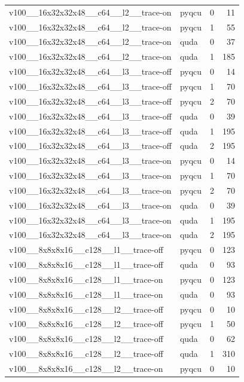 \begin{table}[htbp]
\begin{tabular}{@{}llrr@{}}
v100\_\_16x32x32x48\_\_c64\_\_l2\_\_trace-on & pyqcu & 0 & 11 \\
v100\_\_16x32x32x48\_\_c64\_\_l2\_\_trace-on & pyqcu & 1 & 55 \\
v100\_\_16x32x32x48\_\_c64\_\_l2\_\_trace-on & quda & 0 & 37 \\
v100\_\_16x32x32x48\_\_c64\_\_l2\_\_trace-on & quda & 1 & 185 \\
v100\_\_16x32x32x48\_\_c64\_\_l3\_\_trace-off & pyqcu & 0 & 14 \\
v100\_\_16x32x32x48\_\_c64\_\_l3\_\_trace-off & pyqcu & 1 & 70 \\
v100\_\_16x32x32x48\_\_c64\_\_l3\_\_trace-off & pyqcu & 2 & 70 \\
v100\_\_16x32x32x48\_\_c64\_\_l3\_\_trace-off & quda & 0 & 39 \\
v100\_\_16x32x32x48\_\_c64\_\_l3\_\_trace-off & quda & 1 & 195 \\
v100\_\_16x32x32x48\_\_c64\_\_l3\_\_trace-off & quda & 2 & 195 \\
v100\_\_16x32x32x48\_\_c64\_\_l3\_\_trace-on & pyqcu & 0 & 14 \\
v100\_\_16x32x32x48\_\_c64\_\_l3\_\_trace-on & pyqcu & 1 & 70 \\
v100\_\_16x32x32x48\_\_c64\_\_l3\_\_trace-on & pyqcu & 2 & 70 \\
v100\_\_16x32x32x48\_\_c64\_\_l3\_\_trace-on & quda & 0 & 39 \\
v100\_\_16x32x32x48\_\_c64\_\_l3\_\_trace-on & quda & 1 & 195 \\
v100\_\_16x32x32x48\_\_c64\_\_l3\_\_trace-on & quda & 2 & 195 \\
v100\_\_8x8x8x16\_\_c128\_\_l1\_\_trace-off & pyqcu & 0 & 123 \\
v100\_\_8x8x8x16\_\_c128\_\_l1\_\_trace-off & quda & 0 & 93 \\
v100\_\_8x8x8x16\_\_c128\_\_l1\_\_trace-on & pyqcu & 0 & 123 \\
v100\_\_8x8x8x16\_\_c128\_\_l1\_\_trace-on & quda & 0 & 93 \\
v100\_\_8x8x8x16\_\_c128\_\_l2\_\_trace-off & pyqcu & 0 & 10 \\
v100\_\_8x8x8x16\_\_c128\_\_l2\_\_trace-off & pyqcu & 1 & 50 \\
v100\_\_8x8x8x16\_\_c128\_\_l2\_\_trace-off & quda & 0 & 62 \\
v100\_\_8x8x8x16\_\_c128\_\_l2\_\_trace-off & quda & 1 & 310 \\
v100\_\_8x8x8x16\_\_c128\_\_l2\_\_trace-on & pyqcu & 0 & 10 \\

\end{tabular}
\end{table}
